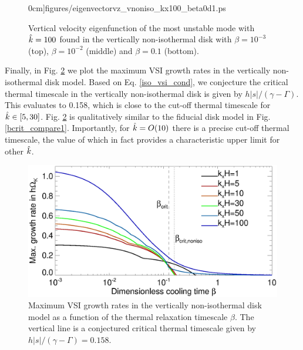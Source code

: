 \begin{figure}
  0cm]{figures/eigenvectorvz_vnoniso_kx100_beta0d1.ps}
  \caption{Vertical velocity eigenfunction of the most unstable mode
    with $\hat{k}=100$ found in the vertically non-isothermal disk with
    $\beta = 10^{-3}$ (top), $\beta=10^{-2}$ (middle) and $\beta=0.1$
    (bottom). 
    \label{compare_eigenvz_vnoniso_kx100}}
\end{figure}
  
Finally, in Fig. \ref{bcrit_compare2} we plot the maximum VSI growth
rates in the vertically non-isothermal disk model. Based on 
Eq. \ref{iso_vsi_cond}, we conjecture the critical 
thermal timescale in the vertically non-isothermal disk is 
given by $ h|s|/(\gamma - \Gamma)$. This 
evaluates to 0.158, which is close to the cut-off thermal timescale
for $\hat{k}\in[5,30]$. Fig. \ref{bcrit_compare2} is qualitatively 
similar to the fiducial disk model in
Fig. \ref{bcrit_compare1}. Importantly, for $\hat{k}=O(10)$ there is a
precise cut-off thermal timescale, the value of which in fact provides a  
characteristic upper limit for other $\hat{k}$. 

\begin{figure}
  \includegraphics[width=\linewidth]{figures/gcorr_compare_vnoniso_maxrate} 
  \caption{Maximum VSI growth rates in the vertically non-isothermal disk
    model as a function of the thermal relaxation timescale
    $\beta$. The vertical line is a conjectured 
    critical thermal timescale given by
    $ h|s|/(\gamma-\Gamma)=0.158$.  
    \label{bcrit_compare2}}   
\end{figure} 




